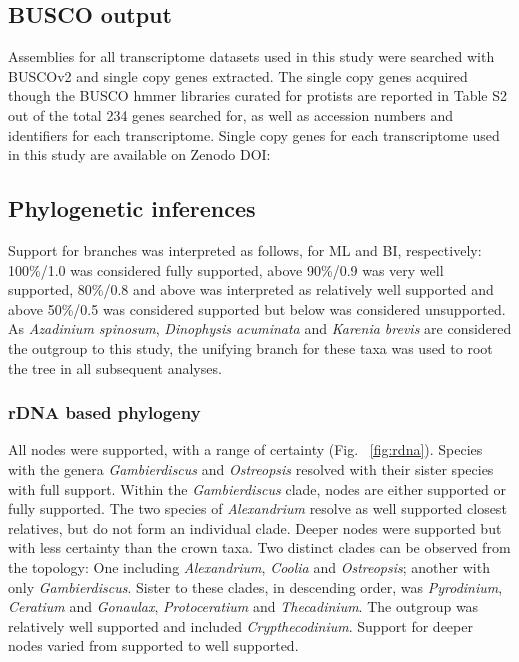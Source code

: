 \documentclass[12pt]{article}
\begin{document}
\subsection*{BUSCO output}
Assemblies for all transcriptome datasets used in this study were searched with BUSCOv2 and single copy genes extracted. 
The single copy genes acquired though the BUSCO hmmer libraries curated for protists are reported in Table S2 out of the total 234 genes searched for, as well as accession numbers and identifiers for each transcriptome. 
Single copy genes for each transcriptome used in this study are available on Zenodo DOI:

\subsection*{Phylogenetic inferences}
Support for branches was interpreted as follows, for ML and BI, respectively: 100\%/1.0 was considered fully supported, above 90\%/0.9 was very well supported, 80\%/0.8 and above was interpreted as relatively well supported and above 50\%/0.5 was considered supported but below was considered unsupported.
As \emph{Azadinium spinosum}, \emph{Dinophysis acuminata} and \emph{Karenia brevis} are considered the outgroup to this study, the unifying branch for these taxa was used to root the tree in all subsequent analyses.
\subsubsection*{rDNA based phylogeny}
\FloatBarrier 
All nodes were supported, with a range of certainty (Fig. ~\ref{fig:rdna}).
Species with the genera \emph{Gambierdiscus} and \emph{Ostreopsis} resolved with their sister species with full support. 
Within the \emph{Gambierdiscus} clade, nodes are either supported or fully supported. 
The two species of \emph{Alexandrium} resolve as well supported closest relatives, but do not form an individual clade. 
Deeper nodes were supported but with less certainty than the crown taxa. 
Two distinct clades can be observed from the topology: One including \emph{Alexandrium}, \emph{Coolia} and \emph{Ostreopsis}; another with only \emph{Gambierdiscus}. 
Sister to these clades, in descending order, was \emph{Pyrodinium}, \emph{Ceratium} and \emph{Gonaulax}, \emph{Protoceratium} and \emph{Thecadinium}. 
The outgroup was relatively well supported and included \emph{Crypthecodinium}. 
Support for deeper nodes varied from supported to well supported.
\end{document}
